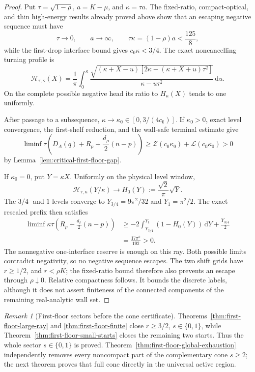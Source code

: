 \documentclass[11pt]{article}
\theoremstyle{remark}
\newtheorem{remark}[theorem]{Remark}
\newcommand{\dd}{\,\mathrm d}
\begin{document}
\begin{proof}
Put $\tau=\sqrt{1-\rho}$, $a=K-\mu$, and $\kappa=\tau a$.
The fixed-ratio, compact-optical, and thin high-energy results already
proved above show that an escaping negative sequence must have
\[
 \tau\to0,\qquad a\to\infty,\qquad
 \tau\kappa=(1-\rho)a<\frac{125}{8},
\]
while the first-drop interface bound gives $c_0\kappa<3/4$.  The exact
noncancelling turning profile is
\begin{equation}
 \mathcal H_{\tau,\kappa}(X)
 =\frac1\pi\int_0^\kappa
 \frac{\sqrt{(\kappa+X-u)
 [2\kappa-(\kappa+X+u)\tau^2]}}
 {\kappa-u\tau^2}\dd u.
 \label{eq:first-floor-noncancelling-profile}
\end{equation}
On the complete possible negative head its ratio to $H_\kappa(X)$ tends
to one uniformly.

After passage to a subsequence, $\kappa\to\kappa_0\in[0,3/(4c_0)]$.
If $\kappa_0>0$, exact level convergence, the first-shelf reduction, and
the wall-safe terminal estimate give
\[
 \liminf\tau\left(D_A(q)+R_p+\frac{d_\rho}{2}(n-p)\right)
 \geq\mathcal Z(c_0\kappa_0)+\mathcal L(c_0\kappa_0)>0
\]
by Lemma~\ref{lem:critical-first-floor-gap}.

If $\kappa_0=0$, put $Y=\kappa X$.  Uniformly on the physical level
window,
\[
 \mathcal H_{\tau,\kappa}(Y/\kappa)
 \longrightarrow H_0(Y):=\frac{\sqrt2}{\pi}\sqrt Y.
\]
The $3/4$- and $1$-levels converge to
$Y_{3/4}=9\pi^2/32$ and $Y_1=\pi^2/2$.  The exact rescaled prefix then
satisfies
\[
 \begin{aligned}
 \liminf\kappa\tau
 \left(R_p+\frac{d_\rho}{2}(n-p)\right)
 &\geq-2\int_{Y_{3/4}}^{Y_1}(1-H_0(Y))\dd Y
 +\frac{Y_{3/4}}2\\
 &=\frac{17\pi^2}{192}>0.
 \end{aligned}
\]
The nonnegative one-interface reserve is enough on this ray.  Both
possible limits contradict negativity, so no negative sequence escapes.
The two shift grids have $r\geq1/2$, and $r<\rho K$; the fixed-ratio
bound therefore also prevents an escape through $\rho\downarrow0$.
Relative compactness follows.  It bounds the discrete labels, although it
does not assert finiteness of the connected components of the remaining
real-analytic wall set.
\end{proof}

\begin{remark}[First-floor sectors before the cone certificate]
\label{rem:first-floor-large-ray-scope}
Theorems~\ref{thm:first-floor-large-ray} and
\ref{thm:first-floor-finite} close $r\geq3/2$, $s\in\{0,1\}$, while
Theorem~\ref{thm:first-floor-small-starts} closes the remaining two starts.
Thus the whole sector $s\in\{0,1\}$ is proved.
Theorem~\ref{thm:first-floor-global-exhaustion} independently removes every
noncompact part of the complementary cone $s\geq2$; the next theorem proves
that full cone directly in the universal active region.
\end{remark}
\end{document}
